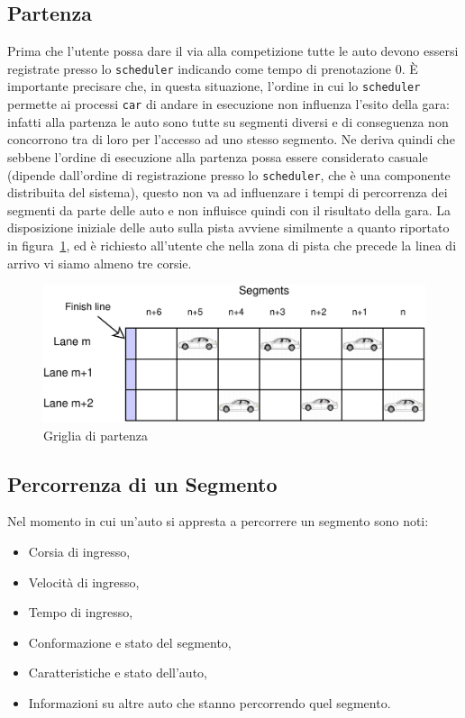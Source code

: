 \documentclass[11pt,a4paper]{report}
\begin{document}
\subsection{Partenza}
Prima che l'utente possa dare il via alla competizione tutte le auto devono essersi registrate presso lo \texttt{scheduler} indicando come tempo di prenotazione $0$. \`E importante precisare che, in questa situazione, l'ordine in cui lo \texttt{scheduler} permette ai processi \texttt{car} di andare in esecuzione non influenza l'esito della gara: infatti alla partenza le auto sono tutte su segmenti diversi e di conseguenza non concorrono tra di loro per l'accesso ad uno stesso segmento. Ne deriva quindi che sebbene l'ordine di esecuzione alla partenza possa essere considerato casuale (dipende dall'ordine di registrazione presso lo \texttt{scheduler}, che è una componente distribuita del sistema), questo non va ad influenzare i tempi di percorrenza dei segmenti da parte delle auto e non influisce quindi con il risultato della gara.
La disposizione iniziale delle auto sulla pista avviene similmente a quanto riportato in figura~\ref{fig:startGrid}, ed è richiesto all'utente che nella zona di pista che precede la linea di arrivo vi siamo almeno tre corsie.

\begin{figure}
\includegraphics[width=\textwidth]{diagrammi/StartGrid}
\caption{Griglia di partenza}
\label{fig:startGrid}
\end{figure}

\subsection{Percorrenza di un Segmento}
\label{sec:percorrenza}
Nel momento in cui un'auto si appresta a percorrere un segmento sono noti:
\begin{itemize}
\item Corsia di ingresso,
\item Velocità di ingresso,
\item Tempo di ingresso,
\item Conformazione e stato del segmento,
\item Caratteristiche e stato dell'auto,
\item Informazioni su altre auto che stanno percorrendo quel segmento.
\end{itemize}
\end{document}
